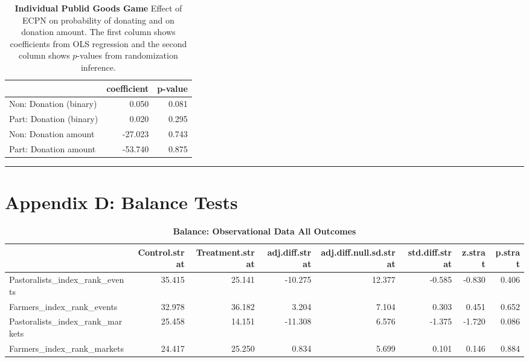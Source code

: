 \documentclass[
]{article}
\begin{document}
\begin{table}[H]
\begin{center}
\label{tab:pgg_tab_ind}
\caption{\textbf{Individual Publid Goods Game} Effect of ECPN on probability of donating and on donation amount. The first column shows coefficients from OLS regression and the second column shows $p$-values from randomization inference.}
\smallskip

\begin{tabular}{l|r|r}
\hline
  & coefficient & p-value\\
\hline
Non: Donation (binary) & 0.050 & 0.081\\
\hline
Part: Donation (binary) & 0.020 & 0.295\\
\hline
Non: Donation amount & -27.023 & 0.743\\
\hline
Part: Donation amount & -53.740 & 0.875\\
\hline
\end{tabular}


\end{center}
\end{table}

\begin{center}\rule{0.5\linewidth}{0.5pt}\end{center}

\newpage

\hypertarget{appendix-d-balance-tests}{%
\section{Appendix D: Balance Tests}\label{appendix-d-balance-tests}}

\begin{table}[H]
\begin{center}
\label{tab:bal_obs_tab1}
\caption{\textbf{Balance: Observational Data All Outcomes}}
\smallskip

\begin{tabular}{l|r|r|r|r|r|r|r}
\hline
  & Control.strat & Treatment.strat & adj.diff.strat & adj.diff.null.sd.strat & std.diff.strat & z.strat & p.strat\\
\hline
Pastoralists\_index\_rank\_events & 35.415 & 25.141 & -10.275 & 12.377 & -0.585 & -0.830 & 0.406\\
\hline
Farmers\_index\_rank\_events & 32.978 & 36.182 & 3.204 & 7.104 & 0.303 & 0.451 & 0.652\\
\hline
Pastoralists\_index\_rank\_markets & 25.458 & 14.151 & -11.308 & 6.576 & -1.375 & -1.720 & 0.086\\
\hline
Farmers\_index\_rank\_markets & 24.417 & 25.250 & 0.834 & 5.699 & 0.101 & 0.146 & 0.884\\
\hline
\end{tabular}


\end{center}
\end{table}
\end{document}
